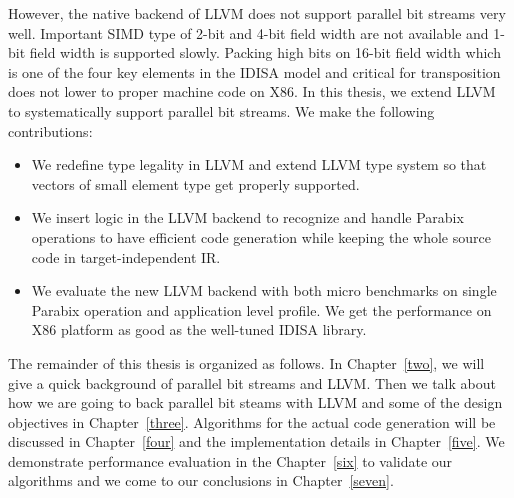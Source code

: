 However, the native backend of LLVM does not support parallel bit streams very well. Important SIMD type of 2-bit and 4-bit field width are not available and 1-bit field width is supported slowly. Packing high bits on 16-bit field width which is one of the four key elements in the IDISA model and critical for transposition does not lower to proper machine code on X86. In this thesis, we extend LLVM to systematically support parallel bit streams. We make the following contributions:

\begin{itemize}
  \item We redefine type legality in LLVM and extend LLVM type system so that vectors of small element type get properly supported.
  \item We insert logic in the LLVM backend to recognize and handle Parabix operations to have efficient code generation while keeping the whole source code in target-independent IR.
  \item We evaluate the new LLVM backend with both micro benchmarks on single Parabix operation and application level profile. We get the performance on X86 platform as good as the well-tuned IDISA library.
\end{itemize}

The remainder of this thesis is organized as follows. In Chapter~\ref{two}, we will give a quick background of parallel bit streams and LLVM\@. Then we talk about how we are going to back parallel bit steams with LLVM and some of the design objectives in Chapter~\ref{three}. Algorithms for the actual code generation will be discussed in Chapter~\ref{four} and the implementation details in Chapter~\ref{five}. We demonstrate performance evaluation in the Chapter~\ref{six} to validate our algorithms and we come to our conclusions in Chapter~\ref{seven}.

